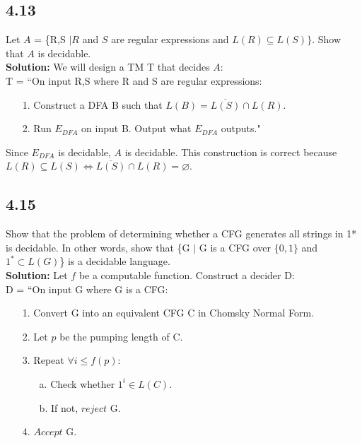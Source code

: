 \subsection*{4.13} Let $A$ = \{\textlangle{}R,S\textrangle{} $| R$ and $S$ are regular expressions and $L(R) \subseteq L(S)\}$. Show that $A$ is decidable.
\\
\textbf{Solution:} We will design a TM T that decides $A$:
\\
T = ``On input \textlangle{}R,S\textrangle{} where R and S are regular expressions:
\begin{enumerate}
\itemsep0em
\item[1.]Construct a DFA B such that $L(B) = \overline{L(S)} \cap L(R)$.
\item[2.]Run $E_{DFA}$ on input \textlangle{}B\textrangle{}. Output what $E_{DFA}$ outputs."
\end{enumerate}
Since $E_{DFA}$ is decidable, $A$ is decidable. This construction is correct because $L(R) \subseteq L(S) \Leftrightarrow \overline{L(S)} \cap L(R) = \varnothing$.

\subsection*{4.15} Show that the problem of determining whether a CFG generates all strings in 1* is decidable. In other words, show that \{\textlangle{}G\textrangle{} $|$ G is a CFG over $\{0, 1\}$ and $1^* \subset L(G)$\} is a decidable language. 
\\
\textbf{Solution:} Let $f$ be a computable function. Construct a decider D:
\\
D = ``On input \textlangle{}G\textrangle{} where G is a CFG:
\begin{enumerate}
\itemsep0em
\item[1.]Convert G into an equivalent CFG C in Chomsky Normal Form.
\item[2.]Let $p$ be the pumping length of C.
\item[3.]Repeat $\forall i \le f(p)$:
\begin{enumerate}
\item[a.]Check whether $1^i \in L(C)$.
\item[b.]If not, $reject$ \textlangle{}G\textrangle{}.
\end{enumerate}
\item[4.]$Accept$ \textlangle{}G\textrangle{}.
\end{enumerate}